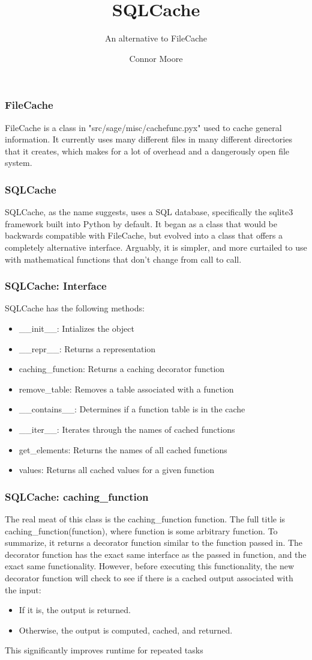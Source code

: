 \documentclass{beamer}
\title{SQLCache}
\subtitle{An alternative to FileCache}
\author{Connor Moore}\institute{University of Washington}
\begin{document}
\begin{frame}
\titlepage

\end{frame}

\begin{frame}
\frametitle{FileCache}
FileCache is a class in "src/sage/misc/cachefunc.pyx" used to cache general information. It currently uses many different files in many different directories that it creates, which makes for a lot of overhead and a dangerously open file system.
\end{frame}

\begin{frame}
\frametitle{SQLCache}
SQLCache, as the name suggests, uses a SQL database, specifically the sqlite3 framework built into Python by default. It began as a class that would be backwards compatible with FileCache, but evolved into a class that offers a completely alternative interface. Arguably, it is simpler, and more curtailed to use with mathematical functions that don't change from call to call.
\end{frame}

\begin{frame}
\frametitle{SQLCache: Interface}
SQLCache has the following methods:
\begin{itemize}
\item \_\_init\_\_: Intializes the object
\item \_\_repr\_\_: Returns a representation
\item caching\_function: Returns a caching decorator function
\item remove\_table: Removes a table associated with a function
\item \_\_contains\_\_: Determines if a function table is in the cache
\item \_\_iter\_\_: Iterates through the names of cached functions
\item get\_elements: Returns the names of all cached functions
\item values: Returns all cached values for a given function
\end{itemize}
\end{frame}

\begin{frame}
\frametitle{SQLCache: caching\_function}
The real meat of this class is the caching\_function function. The full title is caching\_function(function), where function is some arbitrary function. To summarize, it returns a decorator function similar to the function passed in. The decorator function has the exact same interface as the passed in function, and the exact same functionality. However, before executing this functionality, the new decorator function will check to see if there is a cached output associated with the input:
\begin{itemize}
\item If it is, the output is returned.
\item Otherwise, the output is computed, cached, and returned.
\end{itemize}
This significantly improves runtime for repeated tasks
\end{frame}
\end{document}
